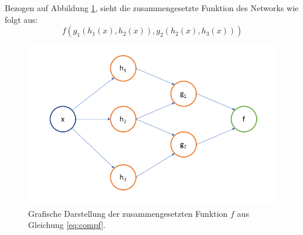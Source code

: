 Bezogen auf Abbildung \ref{fig:composedGraph}, sieht die zusammengesetzte Funktion des Networks wie folgt aus: 
\begin{equation}
\label{eq:compf}
f(g_1(h_1(x), h_2(x)),g_2(h_2(x), h_3(x)))
\end{equation}

\begin{figure}[ht]
\centering
\includegraphics[scale=0.4]{pictures/grafiken/Folie4}
\caption[Caption for LOF]{Grafische Darstellung der zusammengesetzten Funktion $f$ aus Gleichung \ref{eq:compf}.}
\label{fig:composedGraph}

\end{figure}

